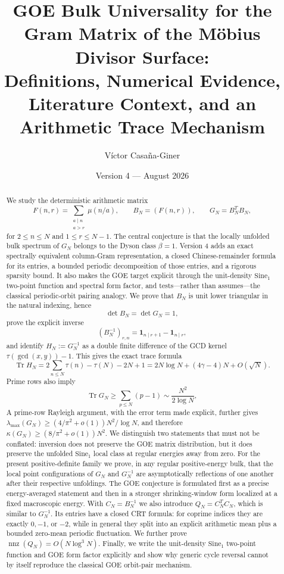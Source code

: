 \documentclass[11pt]{amsart}
\title[GOE Bulk Universality for the M\"obius Divisor Surface]{GOE Bulk Universality for the Gram Matrix of the M\"obius Divisor Surface:\\
Definitions, Numerical Evidence, Literature Context, and an Arithmetic Trace Mechanism}
\author{V\'ictor Casa\~na-Giner}
\date{Version 4 --- August 2026}
\numberwithin{equation}{section}
\theoremstyle{plain}
\theoremstyle{definition}
\theoremstyle{remark}
\newcommand{\mob}{\mu}
\newcommand{\Tr}{\operatorname{Tr}}
\begin{document}
\begin{abstract}
We study the deterministic arithmetic matrix
\begin{equation}
F(n,r)=\sum_{\substack{a\mid n\\ a>r}}\mob(n/a),
\qquad
B_N=(F(n,r)),
\qquad
G_N=B_N^TB_N,
\label{eq:abstract_surface}
\end{equation}
for $2\le n\le N$ and $1\le r\le N-1$.  The central conjecture is that the locally unfolded bulk spectrum of $G_N$ belongs to the Dyson class $\beta=1$.  Version 4 adds an exact spectrally equivalent column-Gram representation, a closed Chinese-remainder formula for its entries, a bounded periodic decomposition of those entries, and a rigorous sparsity bound.  It also makes the GOE target explicit through the unit-density $\mathrm{Sine}_1$ two-point function and spectral form factor, and tests---rather than assumes---the classical periodic-orbit pairing analogy.  We prove that $B_N$ is unit lower triangular in the natural indexing, hence
\begin{equation}
\det B_N=\det G_N=1,
\label{eq:abstract_unimodular}
\end{equation}
prove the explicit inverse
\begin{equation}
(B_N^{-1})_{r,n}=\mathbf 1_{n\mid r+1}-\mathbf 1_{n\mid r},
\label{eq:abstract_inverse}
\end{equation}
and identify $H_N:=G_N^{-1}$ as a double finite difference of the GCD kernel $\tau(\gcd(x,y))-1$.  This gives the exact trace formula
\begin{equation}
\Tr H_N
=2\sum_{n\le N}\tau(n)-\tau(N)-2N+1
=2N\log N+(4\gamma-4)N+O(\sqrt N).
\label{eq:abstract_inverse_trace}
\end{equation}
Prime rows also imply
\begin{equation}
\Tr G_N\ge \sum_{p\le N}(p-1)
\sim \frac{N^2}{2\log N},
\label{eq:abstract_trace_lower}
\end{equation}
A prime-row Rayleigh argument, with the error term made explicit, further gives $\lambda_{\max}(G_N)\ge(4/\pi^2+o(1))N^2/\log N$, and therefore $\kappa(G_N)\ge(8/\pi^2+o(1))N^2$.  We distinguish two statements that must not be conflated: inversion does not preserve the GOE matrix distribution, but it does preserve the unfolded $\mathrm{Sine}_1$ local class at regular energies away from zero.  For the present positive-definite family we prove, in any regular positive-energy bulk, that the local point configurations of $G_N$ and $G_N^{-1}$ are asymptotically reflections of one another after their respective unfoldings.  The GOE conjecture is formulated first as a precise energy-averaged statement and then in a stronger shrinking-window form localized at a fixed macroscopic energy.  With $C_N=B_N^{-1}$ we also introduce $Q_N=C_N^TC_N$, which is similar to $G_N^{-1}$.  Its entries have a closed CRT formula: for coprime indices they are exactly $0,-1$, or $-2$, while in general they split into an explicit arithmetic mean plus a bounded zero-mean periodic fluctuation.  We further prove $\operatorname{nnz}(Q_N)=O(N\log^3N)$.  Finally, we write the unit-density $\mathrm{Sine}_1$ two-point function and GOE form factor explicitly and show why generic cycle reversal cannot by itself reproduce the classical GOE orbit-pair mechanism.


\end{abstract}
\end{document}
